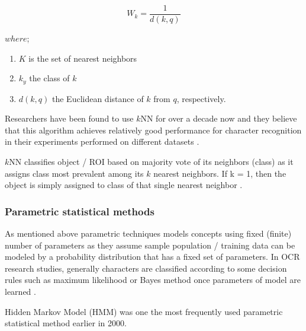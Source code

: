 \documentclass{article}
\begin{document}
\begin{equation}\label{KNNS}
W_{k}= \frac {1} {d(k,q)}
\end{equation}

$where$;

\begin {enumerate}
\item $K$ is the set of nearest neighbors
\item $k_{y}$ the class of $k$
\item $d(k,q)$ the Euclidean distance of $k$ from $q$, respectively.
\end {enumerate}







Researchers have been found to use  $k$NN for over a decade now and they believe that this algorithm achieves relatively good performance for character recognition in their experiments performed on different datasets \cite{pradeep2012neural, lorigo2006offline, chandio2018character, kumar2018improved}. 

$k$NN classifies object / ROI based on majority vote of its neighbors (class) as it assigns class most prevalent among its $k$ nearest neighbors. If k = 1, then the object is simply assigned to class of that single nearest neighbor \cite{vithlani2015study}.



\subsubsection{Parametric statistical methods}

As mentioned above parametric techniques models concepts using fixed (finite) number of parameters as they assume sample population / training data can be modeled by a probability distribution that has a fixed set of parameters. In OCR research studies, generally characters are classified according to some decision rules such as maximum likelihood or Bayes method once parameters of model are learned \cite{arica2001overview}.












Hidden Markov Model (HMM) was one the most frequently used parametric statistical method earlier in 2000. 
\end{document}
